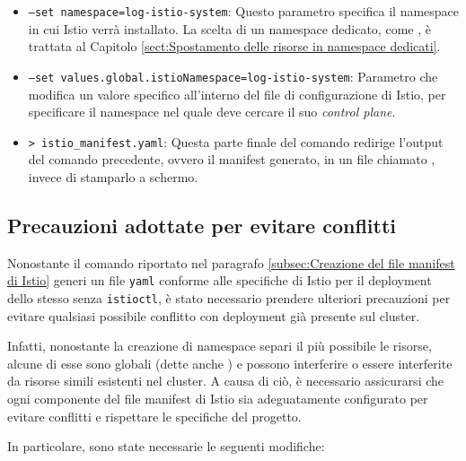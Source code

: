 \begin{itemize}
\item \texttt{--set namespace=log-istio-system}: Questo parametro specifica il namespace in cui Istio verrà installato. La scelta di un namespace dedicato, come , è trattata al Capitolo \ref{sect:Spostamento delle risorse in namespace dedicati}.

\item \texttt{--set values.global.istioNamespace=log-istio-system}: Parametro che modifica un valore specifico all'interno del file di configurazione di Istio, per specificare il namespace nel quale deve cercare il suo \textit{control plane}.

\item \texttt{> istio\_manifest.yaml}: Questa parte finale del comando redirige l'output del comando precedente, ovvero il manifest generato, in un file chiamato , invece di stamparlo a schermo.

\end{itemize}

\subsection{Precauzioni adottate per evitare conflitti}

Nonostante il comando riportato nel paragrafo \ref{subsec:Creazione del file manifest di Istio} generi un file \verb|yaml| conforme alle specifiche di Istio per il deployment dello stesso senza \verb|istioctl|, è stato necessario prendere ulteriori precauzioni per evitare qualsiasi possibile conflitto con deployment già presente sul cluster.

Infatti, nonostante la creazione di namespace separi il più possibile le risorse, alcune di esse sono globali (dette anche ) e possono interferire o essere interferite da risorse simili esistenti nel cluster. A causa di ciò, è necessario assicurarsi che ogni componente del file manifest di Istio sia adeguatamente configurato per evitare conflitti e rispettare le specifiche del progetto.

In particolare, sono state necessarie le seguenti modifiche:

